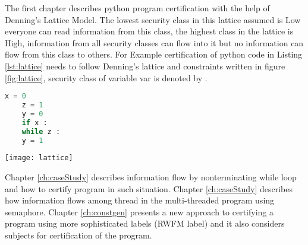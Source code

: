 \begin{enumerate}
	The first chapter describes python program certification with the help of Denning's Lattice Model. The lowest security class in this lattice assumed is Low everyone can read information from this class, the highest class in the lattice is High, 
	information from all security classes can flow into it but no information can flow from this class to others.
	For Example certification of python code in Listing \ref{lst:lattice} needs to follow Denning's lattice and constraints written in figure \ref{fig:lattice}, security class of variable var is denoted by .  
	\begin{lstlisting}[language=Python,caption={Python example}, label={lst:lattice}]
	x = 0
	z = 1
	y = 0
	if x :
	while z :
	y = 1\end{lstlisting}
	\begin{figure*}[h]
		\texttt{[image: lattice]}
		\centering
		\caption{Lattice of Listing \ref{lst:lattice}}
		\label{fig:lattice}
	\end{figure*}
	Chapter \ref{ch:caseStudy} describes information flow by nonterminating while loop and how to certify program in such situation.
	Chapter \ref{ch:caseStudy} describes how information flows among thread in the multi-threaded program using semaphore.
	Chapter \ref{ch:constgen} presents a new approach to certifying a program using more sophisticated labels (RWFM label)
	and it also considers subjects for certification of the program.	
\end{enumerate}     

